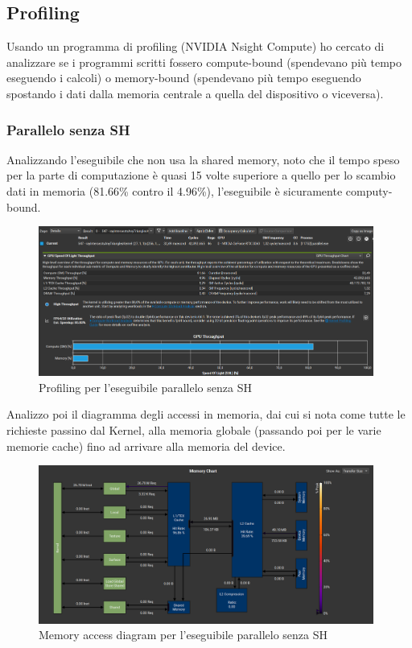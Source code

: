 \documentclass[a4paper]{article}
\begin{document}
\newpage

\subsection{Profiling}

Usando un programma di profiling (NVIDIA Nsight Compute) ho cercato di analizzare se i programmi scritti fossero compute-bound (spendevano più tempo eseguendo i calcoli) o memory-bound (spendevano più tempo eseguendo spostando i dati dalla memoria centrale a quella del dispositivo o viceversa).

\subsubsection{Parallelo senza SH}

Analizzando l'eseguibile che non usa la shared memory, noto che il tempo speso per la parte di computazione è quasi 15 volte superiore a quello per lo scambio dati in memoria (81.66\% contro il 4.96\%), l'eseguibile è sicuramente computy-bound.

\begin{figure}[ht]
    \centering
    \includegraphics[width=0.98\textwidth]{images/parallel.png}
    \caption{Profiling per l'eseguibile parallelo senza SH}
\end{figure}

Analizzo poi il diagramma degli accessi in memoria, dai cui si nota come tutte le richieste passino dal Kernel, alla memoria globale (passando poi per le varie memorie cache) fino ad arrivare alla memoria del device.

\begin{figure}[ht]
    \centering
    \includegraphics[width=0.98\textwidth]{images/parallel_chart.png}
    \caption{Memory access diagram per l'eseguibile parallelo senza SH}
\end{figure}
\end{document}
